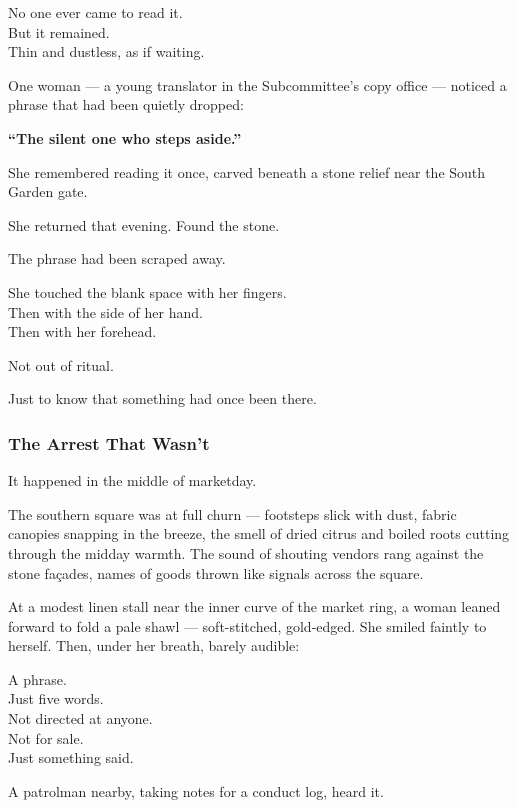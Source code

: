 \documentclass[12pt]{article}
\begin{document}
No one ever came to read it.\\
But it remained.\\
Thin and dustless, as if waiting.

\vspace{1em}

One woman --- a young translator in the Subcommittee’s copy office --- noticed a phrase that had been quietly dropped:

\begin{center}
\textbf{“The silent one who steps aside.”}
\end{center}

She remembered reading it once, carved beneath a stone relief near the South Garden gate.

She returned that evening. Found the stone.

The phrase had been scraped away.

She touched the blank space with her fingers.\\
Then with the side of her hand.\\
Then with her forehead.

Not out of ritual.

Just to know that something had once been there.

\dotfill

\subsubsection*{The Arrest That Wasn’t}

It happened in the middle of marketday.

The southern square was at full churn --- footsteps slick with dust, fabric canopies snapping in the breeze, the smell of dried citrus and boiled roots cutting through the midday warmth. The sound of shouting vendors rang against the stone façades, names of goods thrown like signals across the square.

At a modest linen stall near the inner curve of the market ring, a woman leaned forward to fold a pale shawl --- soft-stitched, gold-edged. She smiled faintly to herself. Then, under her breath, barely audible:

A phrase.\\
Just five words.\\
Not directed at anyone.\\
Not for sale.\\
Just something said.

A patrolman nearby, taking notes for a conduct log, heard it.
\end{document}
